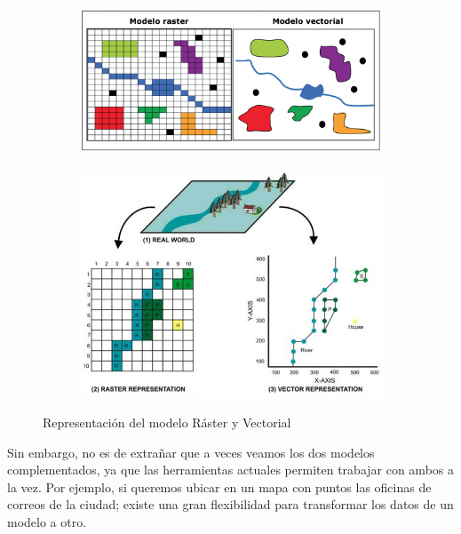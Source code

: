 \begin{figure}[H]
	\centering
	\begin{subfigure}[h]{0.70\textwidth} 
		\includegraphics[width=\textwidth]{imagenes/capitulo2/raster-vectorial}
		\caption{}
	\end{subfigure}       
	\begin{subfigure}[h]{0.75\textwidth} 
		\includegraphics[width=\textwidth]{imagenes/capitulo2/raster-vector-gis-i4}
		\caption{}
	\end{subfigure}
	\caption{Representación del modelo Ráster y Vectorial}
	\label{fig:raster-vectorial}
\end{figure}

Sin embargo, no es de extrañar que a veces veamos los dos modelos complementados, ya que las herramientas actuales permiten trabajar con ambos a la vez. Por ejemplo, si queremos ubicar en un mapa con puntos las oficinas de correos de la ciudad; existe una gran flexibilidad para transformar los datos de un modelo a otro.\\


